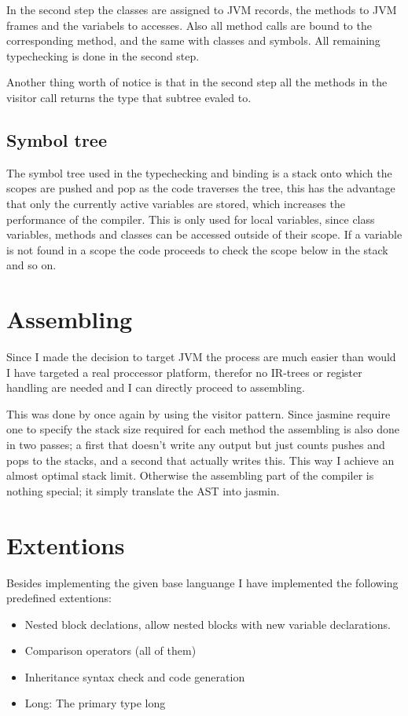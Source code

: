 \documentclass[a4paper,11pt]{article}
\begin{document}
   In the second step the classes are assigned to JVM records, the methods to JVM frames and the variabels to accesses. Also all method calls are bound to the corresponding method, and the same with classes and symbols.
   All remaining typechecking is done in the second step.

   Another thing worth of notice is that in the second step all the methods in the visitor call returns the type that subtree evaled to.

   \subsection{Symbol tree}
   The symbol tree used in the typechecking and binding is a stack onto which the scopes are pushed and pop as the code traverses the tree, this has the advantage that only the currently active variables are
   stored, which increases the performance of the compiler. This is only used for local variables, since class variables, methods and classes can be accessed outside of their scope. If a variable is not found in a scope
   the code proceeds to check the scope below in the stack and so on.

   \section{Assembling}
   Since I made the decision to target JVM the process are much easier than would I have targeted a real proccessor platform, therefor no IR-trees or register handling are needed and I can directly proceed to assembling.

   This was done by once again by using the visitor pattern. Since jasmine require one to specify the stack size required for each method the assembling is also done in two passes; a first that doesn't write any output but just counts pushes and pops to the stacks,
   and a second that actually writes this. This way I achieve an almost optimal stack limit. Otherwise the assembling part of the compiler is nothing special; it simply translate the AST into jasmin.



   \section{Extentions}
   Besides implementing the given base languange I have implemented the following predefined extentions:
   \begin{itemize}
      \item Nested block declations, allow nested blocks with new variable declarations.
      \item Comparison operators (all of them)
      \item Inheritance syntax check and code generation
      \item Long: The primary type long
   \end{itemize}
\end{document}
